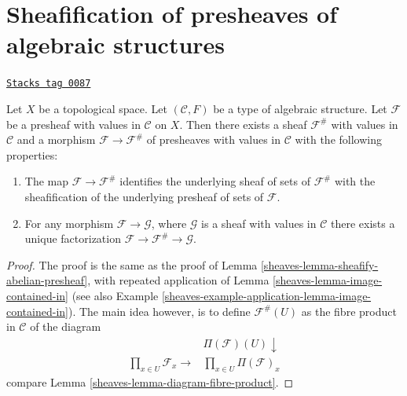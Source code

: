 \section{Sheafification of presheaves of algebraic structures}
\label{sheaves-section-sheafification-presheaves-structures}
\begin{lemma}
\label{sheaves-lemma-sheafify-presheaf-structures}
\href{https://stacks.math.columbia.edu/tag/0087}{\texttt{Stacks tag 0087}}

Let $X$ be a topological space.
Let $(\mathcal{C}, F)$ be a type of algebraic structure.
Let $\mathcal{F}$ be a presheaf with values in $\mathcal{C}$
on $X$. Then there exists a sheaf $\mathcal{F}^\#$ with values
in $\mathcal{C}$ and a morphism $\mathcal{F} \to \mathcal{F}^\#$
of presheaves with values in $\mathcal{C}$ with the
following properties:
\begin{enumerate}
\item The map $\mathcal{F} \to \mathcal{F}^\#$ identifies
the underlying sheaf of sets of $\mathcal{F}^\#$ with
the sheafification of the underlying presheaf of sets of $\mathcal{F}$.
\item For any morphism $\mathcal{F} \to \mathcal{G}$, where
$\mathcal{G}$ is a sheaf with values in $\mathcal{C}$ there exists
a unique factorization $\mathcal{F} \to \mathcal{F}^\# \to \mathcal{G}$.
\end{enumerate}
\end{lemma}

\begin{proof}

The proof is the same as the proof of
Lemma \ref{sheaves-lemma-sheafify-abelian-presheaf},
with repeated application of
Lemma \ref{sheaves-lemma-image-contained-in} (see also
Example \ref{sheaves-example-application-lemma-image-contained-in}).
The main idea however, is to define $\mathcal{F}^\#(U)$
as the fibre product in $\mathcal{C}$ of the diagram
$$
\begin{array}{cc} & \Pi(\mathcal{F})(U) \downarrow \\ \prod_{x \in U} \mathcal{F}_x
\longrightarrow & \prod_{x \in U} \Pi(\mathcal{F})_x\end{array}
$$
compare Lemma \ref{sheaves-lemma-diagram-fibre-product}.
\end{proof}

